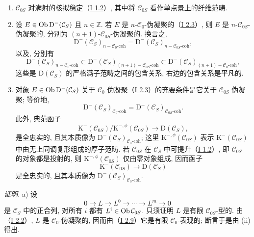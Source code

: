 \begin{enumerate}[label=\alph*)]
\item $\mathcal C_{0S}$ 对满射的核拟稳定（\hyperlink{sga6.e01.sec.1.2}{I 1.2}）, 其中将 $\mathcal C_{0S}$ 看作单点景上的纤维范畴.
\item 设 $E\in\operatorname{Ob} \mathrm D^{-}(\mathcal C_S)$ 且 $n\in\mathbb Z$. 若 $E$ 是 $n$-$\mathcal C_0$-伪凝聚的（\hyperlink{sga6.e01.def.2-3}{I 2.3}）, 则 $E$ 是 $n$-$\mathcal C_{0S}$-伪凝聚的, 分别为 $(n+1)$-$\mathcal C_{0S}$-伪凝聚的. 换言之,
\[
\mathrm D^{-}(\mathcal C_S)_{n-\mathcal C_0\text{-coh}}
=
\mathrm D^{-}(\mathcal C_S)_{n-\mathcal C_{0S}\text{-coh}},
\]
以及, 分别有
\[
\mathrm D^{-}(\mathcal C_S)_{n-\mathcal C_0\text{-coh}}
\subset
\mathrm D^{-}(\mathcal C_S)_{(n+1)-\mathcal C_{0S}\text{-coh}}
\subset
\mathrm D^{-}(\mathcal C_S)_{(n+1)-\mathcal C_0\text{-coh}},
\]
这些是 $\mathrm D(\mathcal C_S)$ 的严格满子范畴之间的包含关系, 右边的包含关系是平凡的.
\item 对象 $E\in\operatorname{Ob}\mathrm D^{-}(\mathcal C_S)$ 关于 $\mathcal C_0$ 伪凝聚（\hyperlink{sga6.e01.def.2-3}{I 2.3}）的充要条件是它关于 $\mathcal C_{0S}$ 伪凝聚; 等价地,
\[
\mathrm D^{-}(\mathcal C_S)_{\mathcal C_0\text{-coh}}
=
\mathrm D^{-}(\mathcal C_S)_{\mathcal C_{0S}\text{-coh}}.
\]
此外, 典范函子
\[
\mathrm K^{-}(\mathcal C_{0S})/\mathrm K^{-,\phi}(\mathcal C_{0S})
\longrightarrow \mathrm D(\mathcal C_S),
\]
是全忠实的, 且其本质像为 $\mathrm D^{-}(\mathcal C_S)_{\mathcal C_0\text{-coh}}$; 这里 $\mathrm K^{-,\phi}(\mathcal C_{0S})$ 表示 $\mathrm K^{-}(\mathcal C_{0S})$ 中由无上同调复形组成的厚子范畴. 若 $\mathcal C_{0S}$ 在 $\mathcal C_S$ 中可提升（\hyperlink{sga6.e01.sec.1.2}{I 1.2}）, 即 $\mathcal C_{0S}$ 的对象都是投射的, 则 $\mathrm K^{-,\phi}(\mathcal C_{0S})$ 仅由零对象组成, 因而函子
\[
\mathrm K^{-}(\mathcal C_{0S})\longrightarrow \mathrm D(\mathcal C_S)
\]
是全忠实的, 且其本质像为 $\mathrm D^{-}(\mathcal C_S)_{\mathcal C_0\text{-coh}}$.
\end{enumerate}

\emph{证明.} a) 设
\[
0\longrightarrow L\longrightarrow L^0\longrightarrow\cdots\longrightarrow L^m\longrightarrow0
\]
是 $\mathcal C_S$ 中的正合列, 对所有 $i$ 都有 $L^i\in\operatorname{Ob}\mathcal C_{0S}$. 只须证明 $L$ 是有限 $\mathcal C_{0S}$-型的. 由（\hyperlink{sga6.e01.prop.2-2}{I 2.2}）, $L$ 是 $\mathcal C_0$-伪凝聚的, 因而由（\hyperlink{sga6.e01.prop.2-9}{I 2.9}）它是有限 $\mathcal C_0$-表现的; 断言于是由 (ii) 得出.

